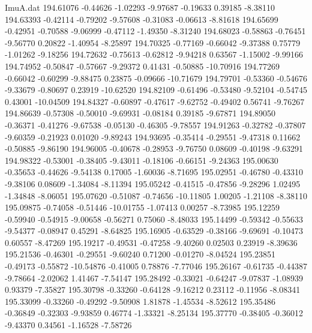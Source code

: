 \begin{filecontents}{ImuA.dat}
 194.61076   -0.44626   -1.02293   -9.97687   -0.19633    0.39185   -8.38110
 194.63393   -0.42114   -0.79202   -9.57608   -0.31083   -0.06613   -8.81618
 194.65699   -0.42951   -0.70588   -9.06999   -0.47112   -1.49350   -8.31240
 194.68023   -0.58863   -0.76451   -9.56770    0.20822   -1.40954   -8.25897
 194.70325   -0.77169   -0.66042   -9.37388    0.75779   -1.01262   -9.18256
 194.72632   -0.75613   -0.62812   -9.94218    0.63567   -1.15002   -9.99166
 194.74952   -0.50847   -0.57667   -9.29372    0.41431   -0.50885  -10.70916
 194.77269   -0.66042   -0.60299   -9.88475    0.23875   -0.09666  -10.71679
 194.79701   -0.53360   -0.54676   -9.33679   -0.80697    0.23919  -10.62520
 194.82109   -0.61496   -0.53480   -9.52104   -0.54745    0.43001  -10.04509
 194.84327   -0.60897   -0.47617   -9.62752   -0.49402    0.56741   -9.76267
 194.86639   -0.57308   -0.50010   -9.69931   -0.08184    0.39185   -9.67871
 194.89050   -0.36371   -0.41276   -9.67538   -0.05130   -0.46305   -9.78557
 194.91263   -0.32782   -0.37807   -9.60359   -0.21923    0.01020   -9.89243
 194.93695   -0.35414   -0.29551   -9.47318    0.11662   -0.50885   -9.86190
 194.96005   -0.40678   -0.28953   -9.76750    0.08609   -0.40198   -9.63291
 194.98322   -0.53001   -0.38405   -9.43011   -0.18106   -0.66151   -9.24363
 195.00630   -0.35653   -0.44626   -9.54138    0.17005   -1.60036   -8.71695
 195.02951   -0.46780   -0.43310   -9.38106    0.08609   -1.34084   -8.11394
 195.05242   -0.41515   -0.47856   -9.28296    1.02495   -1.34848   -8.06051
 195.07620   -0.51087   -0.74656  -10.11805    1.00205   -1.21108   -8.38110
 195.09875   -0.74058   -0.51446  -10.01755   -1.07413    0.00257   -8.73985
 195.12259   -0.59940   -0.54915   -9.00658   -0.56271    0.75060   -8.48033
 195.14499   -0.59342   -0.55633   -9.54377   -0.08947    0.45291   -8.64825
 195.16905   -0.63529   -0.38166   -9.69691   -0.10473    0.60557   -8.47269
 195.19217   -0.49531   -0.47258   -9.40260    0.02503    0.23919   -8.39636
 195.21536   -0.46301   -0.29551   -9.60240    0.71200   -0.01270   -8.04524
 195.23851   -0.49173   -0.55872  -10.54876   -0.41005    0.78876   -7.77046
 195.26167   -0.61735   -0.44387   -9.78664   -2.02062    1.41467   -7.54147
 195.28492   -0.33021   -0.64247   -9.07837   -1.08939    0.93379   -7.35827
 195.30798   -0.33260   -0.64128   -9.16212    0.23112   -0.11956   -8.08341
 195.33099   -0.33260   -0.49292   -9.50908    1.81878   -1.45534   -8.52612
 195.35486   -0.36849   -0.32303   -9.93859    0.46774   -1.33321   -8.25134
 195.37770   -0.38405   -0.36012   -9.43370    0.34561   -1.16528   -7.58726

\end{filecontents}

